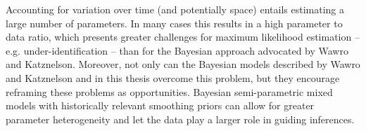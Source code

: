 Accounting for variation over time (and potentially space) entails estimating a large number of parameters. In many cases this results in a high parameter to data ratio, which presents greater challenges for maximum likelihood estimation -- e.g. under-identification -- than for the Bayesian approach advocated by Wawro and Katznelson. Moreover, not only can the Bayesian models described by Wawro and Katznelson and in this thesis overcome this problem, but they encourage reframing these problems as opportunities. Bayesian semi-parametric mixed models with historically relevant smoothing priors can allow for greater parameter heterogeneity and let the data play a larger role in guiding inferences.   